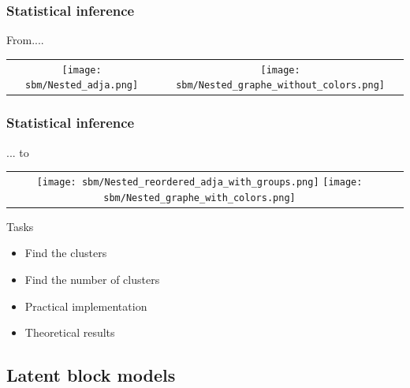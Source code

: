 \documentclass[compress,10pt]{beamer}
\begin{document}
\begin{frame}\frametitle{Statistical inference} 

From.... 

\centering
\begin{tabular}{cc}
 \texttt{[image: sbm/Nested\_adja.png]}&
 \texttt{[image: sbm/Nested\_graphe\_without\_colors.png]}
\end{tabular}
\end{frame}


\begin{frame}\frametitle{Statistical inference} 
... to 

\centering
\begin{tabular}{cc}
\texttt{[image: sbm/Nested\_reordered\_adja\_with\_groups.png]}
\texttt{[image: sbm/Nested\_graphe\_with\_colors.png]}
\end{tabular}

\begin{block}{Tasks}
\begin{itemize}
\item Find the clusters
\item Find the number of clusters
\item Practical implementation
\item Theoretical results
\end{itemize}
\end{block}

 

\end{frame}



\subsection[LBM]{Latent block models}
\end{document}
